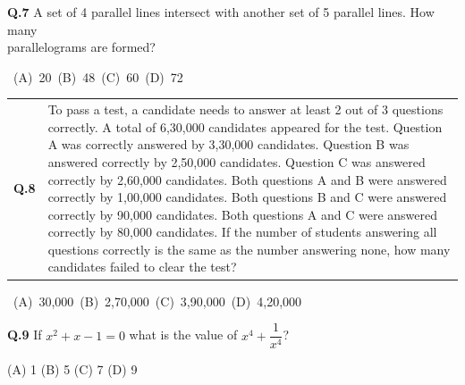 \documentclass[journal,12pt,onecolumn]{IEEEtran}
\theoremstyle{remark}
\begin{document}
\vspace{0.1em}
\noindent
\textbf{Q.7} \quad A set of 4 parallel lines intersect with another set of 5 parallel lines. How many\\
\hspace*{3.2em} parallelograms are formed?

\vspace{0.5cm}

\mbox{ \hspace{1cm} (A) 20 
\hspace { 2 cm } (B) 48 
\hspace { 2 cm } (C) 60 
\hspace { 2 cm } (D) 72 }\\
\vspace{0.3cm}

\noindent
\begin{tabular}
{@{}ll}
\hspace{0cm} \textbf{Q.8}  &  \parbox[t]{0.85\textwidth}{To pass a test, a candidate needs to answer at least 2 out of 3 questions correctly. A total of 6,30,000 candidates appeared for the test. Question A was correctly answered by 3,30,000 candidates. Question B was answered correctly by 2,50,000 candidates. Question C was answered correctly by 2,60,000 candidates. Both questions A and B were answered correctly by 1,00,000 candidates. Both questions B and C were answered correctly by 90,000 candidates. Both questions A and C were answered correctly by 80,000 candidates. If the number of students answering all questions correctly is the same as the number answering none, how many candidates failed to clear the test?}
      
\end{tabular}

 \vspace{0.9cm} 
  \mbox{ \hspace{0.4cm} (A) 30,000
  \hspace{2cm} (B) 2,70,000
  \hspace{2cm} (C) 3,90,000
 \hspace{2cm} (D) 4,20,000 }

\vspace{0.3cm}
 
 \noindent\textbf{Q.9} \hspace{0.5cm}
If $x^2 + x - 1 = 0$ what is the value of $x^4 + \dfrac{1}{x^4}$?

\vspace{0.7cm}

\noindent
\hspace{1.4cm}(A) 1 \hspace{2.5cm} (B) 5 \hspace{2.5cm} (C) 7 \hspace{2.5cm} (D) 9
\end{document}

